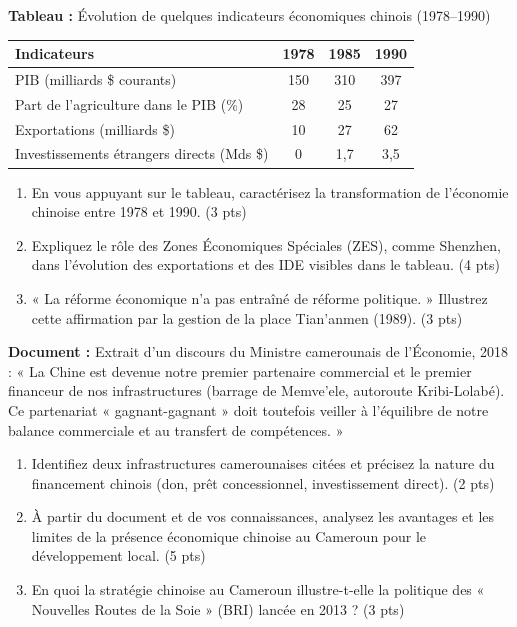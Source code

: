 \documentclass[11pt]{article}
\begin{document}
\begin{exercice}
\textbf{Tableau :} Évolution de quelques indicateurs économiques chinois (1978--1990)\\
\begin{tabular}{|l|c|c|c|}
\hline
\textbf{Indicateurs} & \textbf{1978} & \textbf{1985} & \textbf{1990} \\
\hline
PIB (milliards \$ courants) & 150 & 310 & 397 \\
\hline
Part de l'agriculture dans le PIB (\%) & 28 & 25 & 27 \\
\hline
Exportations (milliards \$) & 10 & 27 & 62 \\
\hline
Investissements étrangers directs (Mds \$) & 0 & 1,7 & 3,5 \\
\hline
\end{tabular}
\begin{enumerate}
\item En vous appuyant sur le tableau, caractérisez la transformation de l'économie chinoise entre 1978 et 1990. \hfill (3 pts)
\item Expliquez le rôle des Zones Économiques Spéciales (ZES), comme Shenzhen, dans l'évolution des exportations et des IDE visibles dans le tableau. \hfill (4 pts)
\item « La réforme économique n'a pas entraîné de réforme politique. » Illustrez cette affirmation par la gestion de la place Tian'anmen (1989). \hfill (3 pts)
\end{enumerate}
\end{exercice}

\begin{exercice}
\textbf{Document :} Extrait d'un discours du Ministre camerounais de l'Économie, 2018 : « La Chine est devenue notre premier partenaire commercial et le premier financeur de nos infrastructures (barrage de Memve'ele, autoroute Kribi-Lolabé). Ce partenariat « gagnant-gagnant » doit toutefois veiller à l'équilibre de notre balance commerciale et au transfert de compétences. »\\
\begin{enumerate}
\item Identifiez deux infrastructures camerounaises citées et précisez la nature du financement chinois (don, prêt concessionnel, investissement direct). \hfill (2 pts)
\item À partir du document et de vos connaissances, analysez les avantages et les limites de la présence économique chinoise au Cameroun pour le développement local. \hfill (5 pts)
\item En quoi la stratégie chinoise au Cameroun illustre-t-elle la politique des « Nouvelles Routes de la Soie » (BRI) lancée en 2013 ? \hfill (3 pts)
\end{enumerate}
\end{exercice}
\end{document}
